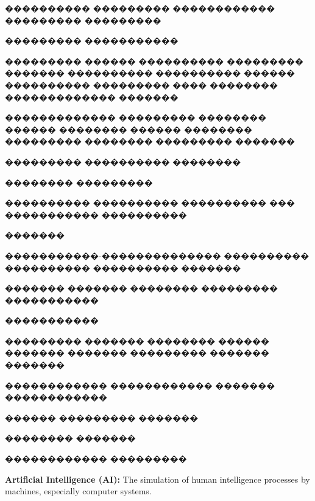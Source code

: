 
\gl
{}
{���������� ���������}
\gl
{}
{������������}
\gl
{}
{���������}
\gl
{}
{���������}


\gl
{}
{��������� �����������}


\gl
{}
{���������}
\gl
{}
{������ ����������}
\gl
{}
{��������� �������}
\gl
{}
{���������� ����������}
\gl
{}
{������ ����������}
\gl
{}
{���������}
\gl
{}
{���� ��������}
\gl
{}
{������������� �������}


\gl
{}
{�������������}
\gl
{}
{��������� ��������}
\gl
{}
{������ ��������}
\gl
{}
{������ ��������}
\gl
{}
{��������� ��������}
\gl
{}
{��������� �������}


\gl
{}
{��������� ����������}
\gl
{}
{��������}


\gl
{}
{��������}
\gl
{}
{���������}

\gl
{}
{���������� ����������}
\gl
{}
{���������� ��� ����������� ����������}

\gl
{}
{�������}

\gl
{}
{�����������-��������������}
\gl
{}
{����������}
\gl
{}
{���������� ���������� �������}


\gl
{}
{������� �������}
\gl
{}
{�������� ��������� �����������}


\gl
{}
{�����������}


\gl
{}
{��������� �������}
\gl
{}
{��������}
\gl
{}
{������ �������}
\gl
{}
{�������}
\gl
{}
{��������� ������� �������}


\gl
{}
{������������}
\gl
{}
{������������ �������}
\gl
{}
{������������}


\gl
{}
{������}
\gl
{}
{��������� �������}


\gl
{}
{�������� �������}


\gl
{}
{������������ ���������}

\textbf{Artificial Intelligence (AI):} The simulation of human intelligence processes by machines, especially computer systems.

